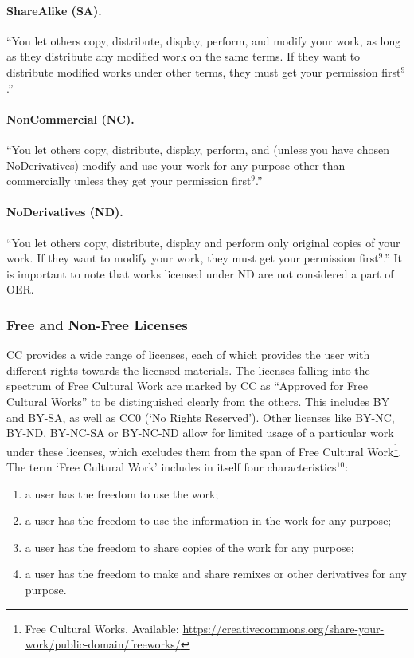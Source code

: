 \documentclass[a4paper]{article}
\begin{document}
\paragraph{ShareAlike (SA).}
``You let others copy, distribute, display, perform, and modify your work, as long as they distribute any modified work on the same terms. If they want to distribute modified works under other terms, they must get your permission first$^9$.''

\paragraph{NonCommercial (NC).}
``You let others copy, distribute, display, perform, and (unless you have chosen NoDerivatives) modify and use your work for any purpose other than commercially unless they get your permission first$^9$.''

\paragraph{NoDerivatives (ND).}
``You let others copy, distribute, display and perform only original copies of your work. If they want to modify your work, they must get your permission first$^9$.'' It is important to note that works licensed under ND are not considered a part of OER.

\subsubsection{Free and Non-Free Licenses}
CC provides a wide range of licenses, each of which provides the user with different rights towards the licensed materials. The licenses falling into the spectrum of Free Cultural Work are marked by CC as ``Approved for Free Cultural Works'' to be distinguished clearly from the others. This includes BY and BY-SA, as well as CC0 (`No Rights Reserved'). Other licenses like BY-NC, BY-ND, BY-NC-SA or BY-NC-ND allow for limited usage of a particular work under these licenses, which excludes them from the span of Free Cultural Work\footnote{Free Cultural Works. Available: \url{https://creativecommons.org/share-your-work/public-domain/freeworks/}}.\\

\noindent
The term `Free Cultural Work' includes in itself four characteristics$^{10}$:
\begin{enumerate}
\item a user has the freedom to use the work;
\item a user has the freedom to use the information in the work for any purpose;
\item a user has the freedom to share copies of the work for any purpose;
\item a user has the freedom to make and share remixes or other derivatives for any purpose. \\
\end{enumerate}
\end{document}
